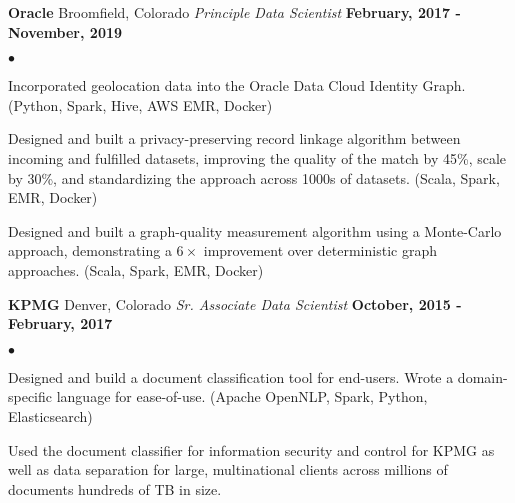 \documentclass[margin,line, 11pt]{res}
\newenvironment{list2}{
  \begin{list}{$\bullet$}{%
      \setlength{\itemsep}{0in}
      \setlength{\parsep}{0in} \setlength{\parskip}{0in}
      \setlength{\topsep}{0in} \setlength{\partopsep}{0in}
      \setlength{\leftmargin}{0.2in}}}{\end{list}}
\begin{document}
\begin{resume}
\textbf{Oracle} \hfill Broomfield, Colorado\newline
\textit{Principle Data Scientist} \hfill \textbf{February, 2017 - November, 2019}\newline
    \begin{list2}
    	\vspace*{-5mm}
      \item Incorporated geolocation data into the Oracle Data Cloud Identity Graph. (Python, Spark, Hive, AWS EMR, Docker)
    	\item Designed and built a privacy-preserving record linkage algorithm between incoming and fulfilled datasets, improving the quality of the match by 45\%, scale by 30\%, and standardizing the approach across 1000s of datasets. (Scala, Spark, EMR, Docker)
    	\item Designed and built a graph-quality measurement algorithm using a Monte-Carlo approach, demonstrating a $6\times$ improvement over deterministic graph approaches. (Scala, Spark, EMR, Docker)
    \end{list2}
\vspace*{-2mm}

\textbf{KPMG} \hfill Denver, Colorado\newline
\textit{Sr. Associate Data Scientist} \hfill \textbf{October, 2015 - February, 2017}\newline
    \begin{list2}
    	\vspace*{-5mm}
      \item Designed and build a document classification tool for end-users. Wrote a domain-specific language for ease-of-use. (Apache OpenNLP, Spark, Python, Elasticsearch)
      \item Used the document classifier for information security and control for KPMG as well as data separation for large, multinational clients across millions of documents hundreds of TB in size.
    \end{list2}
\vspace*{-2mm}



\end{resume}
\end{document}
